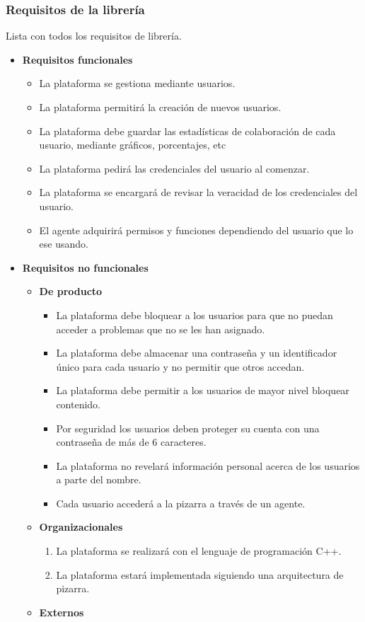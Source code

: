 \subsubsection{Requisitos de la librería}
Lista con todos los requisitos de librería.
\begin{itemize}
\item \textbf{Requisitos funcionales}
		\begin{itemize}
			\item La plataforma se gestiona mediante usuarios.
					\item La plataforma permitirá la creación de nuevos usuarios.
					\item La plataforma debe guardar las estadísticas de colaboración de cada usuario, mediante gráficos, porcentajes, etc
					\item La plataforma pedirá las credenciales del usuario al comenzar.
					\item La plataforma se encargará de revisar la veracidad de los credenciales del usuario.
					\item El agente adquirirá permisos y funciones dependiendo del usuario que lo ese usando.
		\end{itemize}
\item \textbf{Requisitos no funcionales}
		\begin{itemize}
			\item \textbf{De producto}
					\begin{itemize}
					\item La plataforma debe bloquear a los usuarios para que no puedan acceder a problemas que no se les han asignado.
					\item La plataforma debe almacenar una contraseña y un identificador único para cada usuario y no permitir que otros accedan.
					\item La plataforma debe permitir a los usuarios de mayor nivel bloquear contenido.
					\item Por seguridad los usuarios deben proteger su cuenta con una contraseña de más de 6 caracteres.
					\item La plataforma no revelará información personal acerca de los usuarios a parte del nombre.
					\item Cada usuario accederá a la pizarra a través de un agente.
					\end{itemize}
			\item \textbf{Organizacionales}
					\begin{enumerate}
						\item La plataforma se realizará con el lenguaje de programación C++.
						\item La plataforma estará implementada siguiendo una arquitectura de pizarra.
					\end{enumerate}
			\item \textbf{Externos}
		\end{itemize}
\end{itemize}

